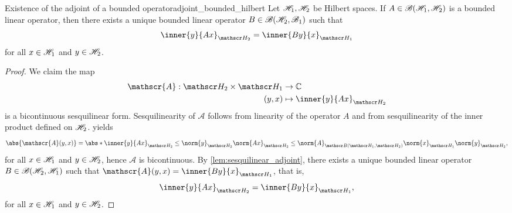 \begin{theorem}{Existence of the adjoint of a bounded operator}{adjoint_bounded_hilbert}
    Let \(\mathscr{H}_1, \mathscr{H}_2\) be Hilbert spaces. If \(A \in \mathscr{B}(\mathscr{H}_1, \mathscr{H}_2)\) is a bounded linear operator, then there exists a unique bounded linear operator \(B \in \mathscr{B}(\mathscr{H}_2, \mathscr{B}_1)\) such that
    \begin{equation*}
        \inner{y}{Ax}_{\hilbert_2} = \inner{By}{x}_{\hilbert_1}
    \end{equation*}
    for all \(x \in \mathscr{H}_1\) and \(y \in \mathscr{H}_2\).
\end{theorem}
\begin{proof}
    We claim the map
    \begin{align*}
        \mathscr{A} : \hilbert_2 \times \hilbert_1 &\to \mathbb{C}\\
                                             (y,x) &\mapsto \inner{y}{Ax}_{\hilbert_2}
    \end{align*}
    is a bicontinuous sesquilinear form. Sesquilinearity of \(\mathscr{A}\) follows from linearity of the operator \(A\) and from sesquilinearity of the inner product defined on \(\mathscr{H}_2\).  yields
    \begin{equation*}
        \abs{\mathscr{A}(y,x)} = \abs*{\inner{y}{Ax}_{\hilbert_2}} \leq \norm{y}_{\hilbert_2} \norm{Ax}_{\hilbert_2} \leq \norm{A}_{\bounded(\hilbert_1, \hilbert_2)} \norm{x}_{\hilbert_1} \norm{y}_{\hilbert_2},
    \end{equation*}
    for all \(x \in \mathscr{H}_1\) and \(y \in \mathscr{H}_2\), hence \(\mathscr{A}\) is bicontinuous. By \cref{lem:sesquilinear_adjoint}, there exists a unique bounded linear operator \(B \in \mathscr{B}(\mathscr{H}_2, \mathscr{H}_1)\) such that \(\mathscr{A}(y,x) = \inner{By}{x}_{\hilbert_1}\), that is,
    \begin{equation*}
        \inner{y}{Ax}_{\hilbert_2} = \inner{By}{x}_{\hilbert_1},
    \end{equation*}
    for all \(x \in \mathscr{H}_1\) and \(y \in \mathscr{H}_2\).
\end{proof}

